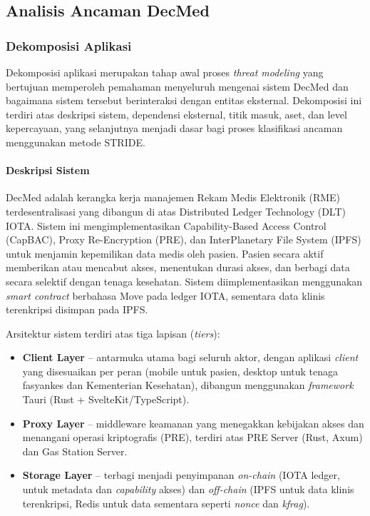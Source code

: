 \subsection{Analisis Ancaman DecMed}

\subsubsection{Dekomposisi Aplikasi}

Dekomposisi aplikasi merupakan tahap awal proses \textit{threat modeling} yang bertujuan memperoleh pemahaman menyeluruh mengenai sistem DecMed dan bagaimana sistem tersebut berinteraksi dengan entitas eksternal. Dekomposisi ini terdiri atas deskripsi sistem, dependensi eksternal, titik masuk, aset, dan level kepercayaan, yang selanjutnya menjadi dasar bagi proses klasifikasi ancaman menggunakan metode STRIDE.

\paragraph{Deskripsi Sistem}

DecMed adalah kerangka kerja manajemen Rekam Medis Elektronik (RME) terdesentralisasi yang dibangun di atas Distributed Ledger Technology (DLT) IOTA. Sistem ini mengimplementasikan Capability-Based Access Control (CapBAC), Proxy Re-Encryption (PRE), dan InterPlanetary File System (IPFS) untuk menjamin kepemilikan data medis oleh pasien. Pasien secara aktif memberikan atau mencabut akses, menentukan durasi akses, dan berbagi data secara selektif dengan tenaga kesehatan. Sistem diimplementasikan menggunakan \textit{smart contract} berbahasa Move pada ledger IOTA, sementara data klinis terenkripsi disimpan pada IPFS.

Arsitektur sistem terdiri atas tiga lapisan (\textit{tiers}):
\begin{itemize}
    \item \textbf{Client Layer} -- antarmuka utama bagi seluruh aktor, dengan aplikasi \textit{client} yang disesuaikan per peran (mobile untuk pasien, desktop untuk tenaga fasyankes dan Kementerian Kesehatan), dibangun menggunakan \textit{framework} Tauri (Rust + SvelteKit/TypeScript).
    \item \textbf{Proxy Layer} -- middleware keamanan yang menegakkan kebijakan akses dan menangani operasi kriptografis (PRE), terdiri atas PRE Server (Rust, Axum) dan Gas Station Server.
    \item \textbf{Storage Layer} -- terbagi menjadi penyimpanan \textit{on-chain} (IOTA ledger, untuk metadata dan \textit{capability} akses) dan \textit{off-chain} (IPFS untuk data klinis terenkripsi, Redis untuk data sementara seperti \textit{nonce} dan \textit{kfrag}).
\end{itemize}

